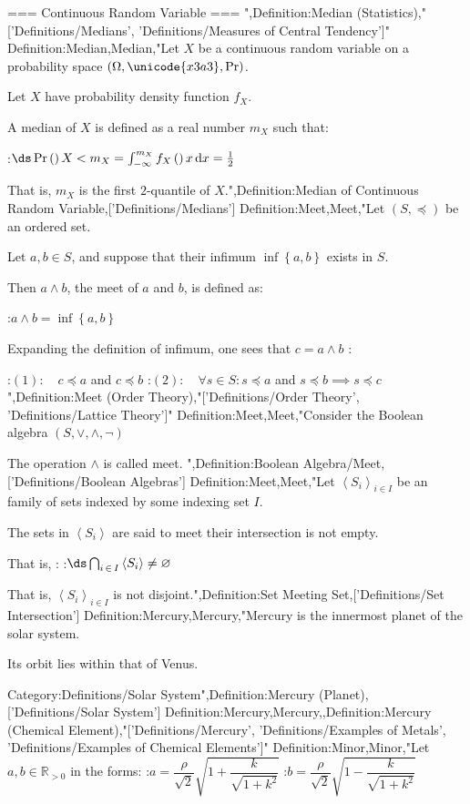 === Continuous Random Variable ===
",Definition:Median (Statistics),"['Definitions/Medians', 'Definitions/Measures of Central Tendency']"
Definition:Median,Median,"Let $X$ be a continuous random variable on a probability space $\left( \Omega, \unicode{x3a3}, \Pr \right)$.

Let $X$ have probability density function $f_X$. 

A median of $X$ is defined as a real number $m_X$ such that: 

:$\ds \Pr \left(   \right){X < m_X} = \int_{-\infty}^{m_X} f_X \left(   \right)x \,\mathrm d x = \frac 1 2$

That is, $m_X$ is the first $2$-quantile of $X$.",Definition:Median of Continuous Random Variable,['Definitions/Medians']
Definition:Meet,Meet,"Let $\left( S, \preceq \right)$ be an ordered set.

Let $a, b \in S$, and suppose that their infimum $\inf \left\lbrace a, b \right\rbrace$ exists in $S$.


Then $a \wedge b$, the meet of $a$ and $b$, is defined as:

:$a \wedge b = \inf \left\lbrace a, b \right\rbrace$


Expanding the definition of infimum, one sees that $c = a \wedge b$ :

:$(1): \quad c \preceq a$ and $c \preceq b$
:$(2): \quad \forall s \in S: s \preceq a$ and $s \preceq b \implies s \preceq c$",Definition:Meet (Order Theory),"['Definitions/Order Theory', 'Definitions/Lattice Theory']"
Definition:Meet,Meet,"Consider the Boolean algebra $\left( S, \vee, \wedge, \neg \right)$


The operation $\wedge$ is called meet.
",Definition:Boolean Algebra/Meet,['Definitions/Boolean Algebras']
Definition:Meet,Meet,"Let $\left\langle S_i \right\rangle_{i \mathop \in I}$ be an family of sets indexed by some  indexing set $I$.

The sets in $\left\langle S_i \right\rangle$ are said to meet  their intersection is not empty.


That is, :
:$\ds \bigcap_{i \mathop \in I} \left\langle S_i \right\rangle \ne \varnothing$


That is,  $\left\langle S_i \right\rangle_{i \mathop \in I}$ is not disjoint.",Definition:Set Meeting Set,['Definitions/Set Intersection']
Definition:Mercury,Mercury,"Mercury is the innermost planet of the solar system.

Its orbit lies within that of Venus.

Category:Definitions/Solar System",Definition:Mercury (Planet),['Definitions/Solar System']
Definition:Mercury,Mercury,,Definition:Mercury (Chemical Element),"['Definitions/Mercury', 'Definitions/Examples of Metals', 'Definitions/Examples of Chemical Elements']"
Definition:Minor,Minor,"Let $a, b \in \mathbb R_{>0}$ in the forms:
:$a = \dfrac \rho {\sqrt 2} \sqrt {1 + \dfrac k {\sqrt {1 + k^2} } }$
:$b = \dfrac \rho {\sqrt 2} \sqrt {1 - \dfrac k {\sqrt {1 + k^2} } }$

